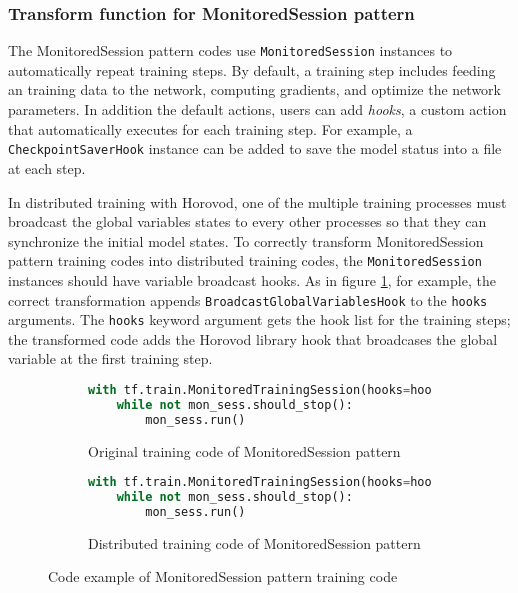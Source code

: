 \subsubsection{Transform function for MonitoredSession pattern}

The MonitoredSession pattern codes use {\tt MonitoredSession} instances
to automatically repeat training steps.
By default, a training step includes feeding an training data to the network,
computing gradients, and optimize the network parameters.
In addition the default actions, users can add \textit{hooks},
a custom action that automatically executes for each training step.
For example, a {\tt CheckpointSaverHook} instance can be added to
save the model status into a file at each step.

In distributed training with Horovod, one of the multiple training processes
must broadcast the global variables states to every other processes so that
they can synchronize the initial model states.
To correctly transform MonitoredSession pattern training codes into
distributed training codes, the {\tt MonitoredSession} instances should have
variable broadcast hooks.
As in figure \ref{fig:trans:monsesstrans}, for example,
the correct transformation appends {\tt BroadcastGlobalVariablesHook} to the
{\tt hooks} arguments.
The {\tt hooks} keyword argument gets the hook list for the training steps;
the transformed code adds the Horovod library hook that broadcases the
global variable at the first training step.

\begin{figure}[ht!]
  \centering
  \begin{subfigure}[t]{0.45\textwidth}
    \begin{lstlisting}[language=Python]
with tf.train.MonitoredTrainingSession(hooks=hooks) as mon_sess:
    while not mon_sess.should_stop():
        mon_sess.run()
    \end{lstlisting}
    \caption{Original training code of MonitoredSession pattern}
  \end{subfigure}
  \hspace{5mm}
  \begin{subfigure}[t]{0.45\textwidth}
    \begin{lstlisting}[language=Python]
with tf.train.MonitoredTrainingSession(hooks=hooks.append(hvd.BroadcastGlobalVariablesHook(0)) as mon_sess:
    while not mon_sess.should_stop():
        mon_sess.run()
    \end{lstlisting}
    \caption{Distributed training code of MonitoredSession pattern}
  \end{subfigure}
  \caption{Code example of MonitoredSession pattern training code}
  \label{fig:trans:monsesstrans}
\end{figure}

